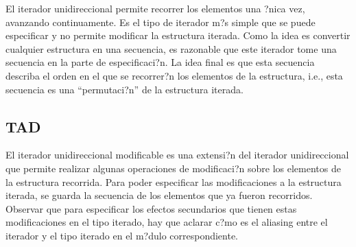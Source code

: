 \documentclass[a4paper,10pt]{article}
\begin{document}
El iterador unidireccional permite recorrer los elementos una ?nica vez, avanzando continuamente.  Es el tipo de iterador m?s simple que se puede especificar y no permite modificar la estructura iterada.  Como la idea es convertir cualquier estructura en una secuencia, es razonable que este iterador tome una secuencia en la parte de especificaci?n.  La idea final es que esta secuencia describa el orden en el que se recorrer?n los elementos de la estructura, i.e., esta secuencia es una ``permutaci?n'' de la estructura iterada.

\begin{tad}{}




  \tadObservadores

  \tadGeneradores

  \tadOtrasOperaciones


  \tadAxiomas
\end{tad}

\subsection{TAD }

El iterador unidireccional modificable es una extensi?n del iterador unidireccional que permite realizar algunas operaciones de modificaci?n sobre los elementos de la estructura recorrida.  Para poder especificar las modificaciones a la estructura iterada, se guarda la secuencia de los elementos que ya fueron recorridos.  Observar que para especificar los efectos secundarios que tienen estas modificaciones en el tipo iterado, hay que aclarar c?mo es el aliasing entre el iterador y el tipo iterado en el m?dulo correspondiente.
\end{document}
